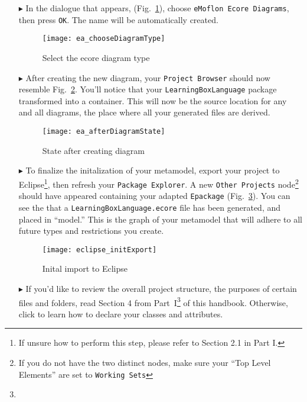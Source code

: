 \begin{itemize}
\item[$\blacktriangleright$] In the dialogue that appears, (Fig.~\ref{fig:diagram_type}), choose \texttt{eMoflon Ecore Diagrams}, then press \texttt{OK}. The
name will be automatically created.

\begin{figure}[htbp]
	\centering
  \texttt{[image: ea\_chooseDiagramType]}
	\caption{Select the ecore diagram type}
	\label{fig:diagram_type}
\end{figure}
\FloatBarrier

 
\item[$\blacktriangleright$] After creating the new diagram, your  \texttt{Project Browser} should now resemble Fig.~\ref{fig:diagram_completed}. You'll notice
that your \texttt{LearningBoxLanguage} package transformed into a container. This will now be the source location for any and all diagrams, the place where
all your generated files are derived.

\begin{figure}[htbp]
	\centering
  \texttt{[image: ea\_afterDiagramState]}
	\caption{State after creating diagram}
	\label{fig:diagram_completed}
\end{figure}
\FloatBarrier

\newpage

\item[$\blacktriangleright$] To finalize the initalization of your metamodel, export your project to Eclipse\footnote{If unsure how to perform this step, please
refer to Section 2.1 in Part I.}, then refresh your \texttt{Package Explorer}. A new \texttt{Other Projects} node\footnote{If you do not have the two distinct
nodes, make sure your ``Top Level Elements'' are set to \texttt{Working Sets}} should have appeared containing your adapted \texttt{Epackage}
(Fig.~\ref{fig:init_import}). You can see the that a \texttt{LearningBoxLanguage.ecore} file has been generated, and placed in ``model.'' This is the graph of
your metamodel that will adhere to all future types and restrictions you create.

\vspace{0.5cm}

\begin{figure}[htbp]
	\centering
  \texttt{[image: eclipse\_initExport]}
	\caption{Inital import to Eclipse}
	\label{fig:init_import}
\end{figure}
\FloatBarrier

\vspace{0.5cm}

\item[$\blacktriangleright$] If you'd like to review the overall project structure, the purposes of certain files and folders, read Section 4 from
Part~I\footnote{\downLink} of this handbook. Otherwise, click to learn how to declare your classes and attributes.

\end{itemize}
